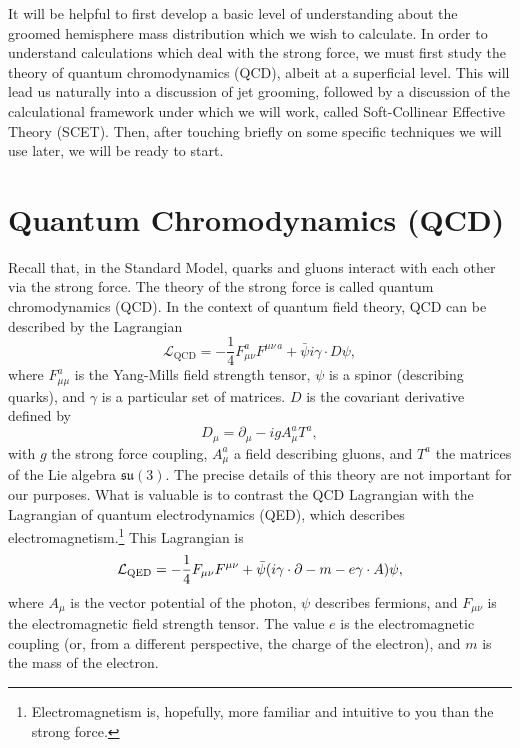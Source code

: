 \documentclass[../thesis.tex]{subfiles}
\providecommand{\cL}{\mathcal{L}}
\providecommand{\su}{\mathfrak{su}}
\begin{document}
	It will be helpful to first develop a basic level of understanding about the groomed hemisphere mass distribution which we wish to calculate. In order to understand calculations which deal with the strong force, we must first study the theory of quantum chromodynamics (QCD), albeit at a superficial level. This will lead us naturally into a discussion of jet grooming, followed by a discussion of the calculational framework under which we will work, called Soft-Collinear Effective Theory (SCET). Then, after touching briefly on some specific techniques we will use later, we will be ready to start.

\section{Quantum Chromodynamics (QCD)}\label{technical-sec:QCD}
	Recall that, in the Standard Model, quarks and gluons interact with each other via the strong force. The theory of the strong force is called quantum chromodynamics (QCD). In the context of quantum field theory, QCD can be described by the Lagrangian \cite{larkoski_elementary_2019-1}
	\begin{equation}\label{technical-eq:QCD Lagrangian}
		\cL_{\mathrm{QCD}} = -\frac{1}{4} F_{\mu\nu}^a F^{\mu \nu\,a} + \bar \psi i \gamma \cdot D \psi,
	\end{equation}
	where $F_{\mu\mu}^a$ is the Yang-Mills field strength tensor, $\psi$ is a spinor (describing quarks), and $\gamma$ is a particular set of matrices. $D$ is the covariant derivative defined by
	\begin{equation}
		D_\mu = \partial_\mu - i g A_\mu^a T^a,
	\end{equation}
	with $g$ the strong force coupling, $A_\mu^a$ a field describing gluons, and $T^a$ the matrices of the Lie algebra $\su(3)$. The precise details of this theory are not important for our purposes. What is valuable is to contrast the QCD Lagrangian with the Lagrangian of quantum electrodynamics (QED), which describes electromagnetism.\footnote{Electromagnetism is, hopefully, more familiar and intuitive to you than the strong force.} This Lagrangian is \cite{larkoski_elementary_2019-1}
	\begin{equation}\label{technical-eq:QED Lagrangian}
		\cL_{\mathrm{QED}} = -\frac{1}{4} F_{\mu\nu} F^{\mu \nu} + \bar \psi \qty(i \gamma \cdot \partial - m - e\gamma \cdot A)\psi,
	\end{equation}
	where $A_\mu$ is the vector potential of the photon, $\psi$ describes fermions, and $F_{\mu\nu}$ is the electromagnetic field strength tensor. The value $e$ is the electromagnetic coupling (or, from a different perspective, the charge of the electron), and $m$ is the mass of the electron.
\end{document}
